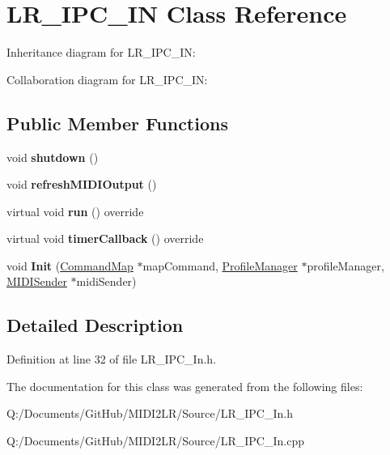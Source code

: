 \hypertarget{class_l_r___i_p_c___i_n}{}\section{L\+R\+\_\+\+I\+P\+C\+\_\+\+IN Class Reference}
\label{class_l_r___i_p_c___i_n}


Inheritance diagram for L\+R\+\_\+\+I\+P\+C\+\_\+\+IN\+:


Collaboration diagram for L\+R\+\_\+\+I\+P\+C\+\_\+\+IN\+:
\subsection*{Public Member Functions}
\begin{DoxyCompactItemize}
\item 
void {\bfseries shutdown} ()\hypertarget{class_l_r___i_p_c___i_n_a1eeca511d978f03330310e601390ddcc}{}\label{class_l_r___i_p_c___i_n_a1eeca511d978f03330310e601390ddcc}

\item 
void {\bfseries refresh\+M\+I\+D\+I\+Output} ()\hypertarget{class_l_r___i_p_c___i_n_af51e690dc3bc4e84d652642e5f2f1141}{}\label{class_l_r___i_p_c___i_n_af51e690dc3bc4e84d652642e5f2f1141}

\item 
virtual void {\bfseries run} () override\hypertarget{class_l_r___i_p_c___i_n_a328f5058bbfdbeba4345cc4d0b159bbb}{}\label{class_l_r___i_p_c___i_n_a328f5058bbfdbeba4345cc4d0b159bbb}

\item 
virtual void {\bfseries timer\+Callback} () override\hypertarget{class_l_r___i_p_c___i_n_acdeca8e06bd01cb71ea026fca630823c}{}\label{class_l_r___i_p_c___i_n_acdeca8e06bd01cb71ea026fca630823c}

\item 
void {\bfseries Init} (\hyperlink{class_command_map}{Command\+Map} $\ast$map\+Command, \hyperlink{class_profile_manager}{Profile\+Manager} $\ast$profile\+Manager, \hyperlink{class_m_i_d_i_sender}{M\+I\+D\+I\+Sender} $\ast$midi\+Sender)\hypertarget{class_l_r___i_p_c___i_n_aa4519a3c52332bbc21ebd03a2a2c4411}{}\label{class_l_r___i_p_c___i_n_aa4519a3c52332bbc21ebd03a2a2c4411}

\end{DoxyCompactItemize}


\subsection{Detailed Description}


Definition at line 32 of file L\+R\+\_\+\+I\+P\+C\+\_\+\+In.\+h.



The documentation for this class was generated from the following files\+:\begin{DoxyCompactItemize}
\item 
Q\+:/\+Documents/\+Git\+Hub/\+M\+I\+D\+I2\+L\+R/\+Source/L\+R\+\_\+\+I\+P\+C\+\_\+\+In.\+h\item 
Q\+:/\+Documents/\+Git\+Hub/\+M\+I\+D\+I2\+L\+R/\+Source/L\+R\+\_\+\+I\+P\+C\+\_\+\+In.\+cpp\end{DoxyCompactItemize}
